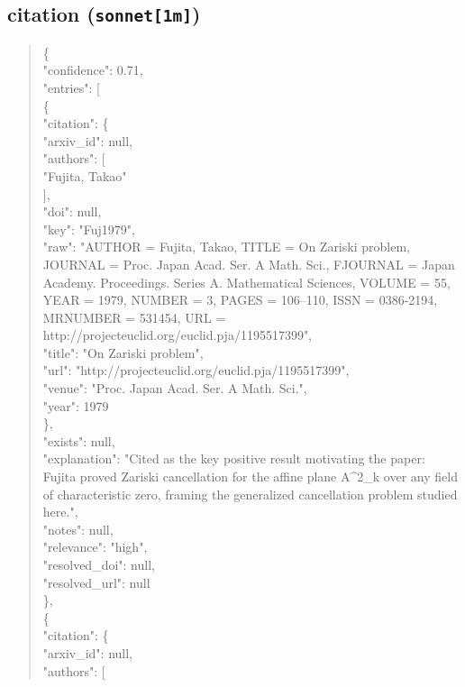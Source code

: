 \documentclass[11pt]{article}
\begin{document}
\subsection*{citation (\texttt{sonnet[1m]})}
\begin{quote}\small\ttfamily\raggedright
\{\\
  "confidence": 0.71,\\
  "entries": [\\
    \{\\
      "citation": \{\\
        "arxiv\_id": null,\\
        "authors": [\\
          "Fujita, Takao"\\
        ],\\
        "doi": null,\\
        "key": "Fuj1979",\\
        "raw": "AUTHOR = Fujita, Takao, TITLE = On Zariski problem, JOURNAL = Proc. Japan Acad. Ser. A Math. Sci., FJOURNAL = Japan Academy. Proceedings. Series A. Mathematical Sciences, VOLUME = 55, YEAR = 1979, NUMBER = 3, PAGES = 106--110, ISSN = 0386-2194, MRNUMBER = 531454, URL = http://projecteuclid.org/euclid.pja/1195517399",\\
        "title": "On Zariski problem",\\
        "url": "http://projecteuclid.org/euclid.pja/1195517399",\\
        "venue": "Proc. Japan Acad. Ser. A Math. Sci.",\\
        "year": 1979\\
      \},\\
      "exists": null,\\
      "explanation": "Cited as the key positive result motivating the paper: Fujita proved Zariski cancellation for the affine plane A\^{}2\_k over any field of characteristic zero, framing the generalized cancellation problem studied here.",\\
      "notes": null,\\
      "relevance": "high",\\
      "resolved\_doi": null,\\
      "resolved\_url": null\\
    \},\\
    \{\\
      "citation": \{\\
        "arxiv\_id": null,\\
        "authors": [\\

\end{quote}
\end{document}
